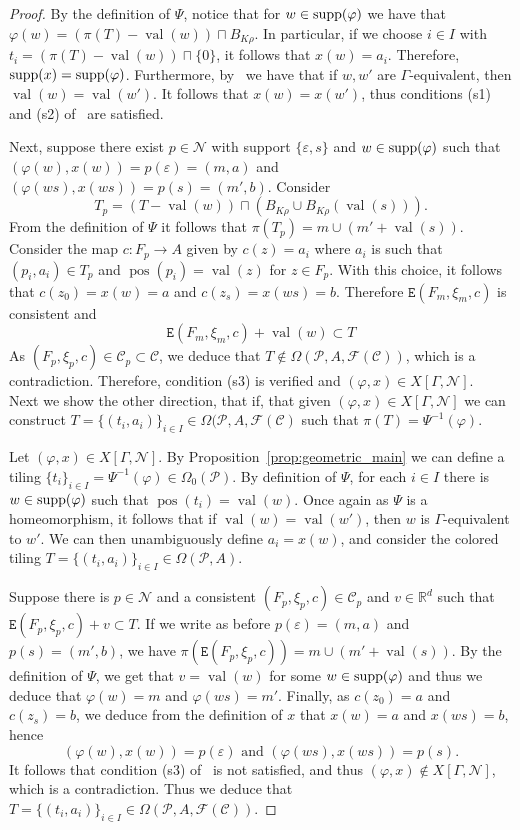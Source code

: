 \documentclass{article}
\theoremstyle{definition}
\theoremstyle{definition}
\newcommand{\RR}{\mathbb{R}}
\newcommand{\PP}{\mathcal{P}}
\newcommand{\FF}{\mathcal{F}}
\newcommand{\val}{\operatorname{val}}
\newcommand{\pos}{\operatorname{pos}}
\newcommand{\supp}{\textnormal{supp}}
\begin{document}
\begin{proof}
By the definition of $\Psi$, notice that for $w \in \supp(\varphi)$ we have that $\varphi(w)= (\pi(T)-\val(w))\sqcap B_{K\rho}$. In particular, if we choose $i \in I$ with $t_i = (\pi(T)-\val(w))\sqcap \{0\}$, it follows that $x(w)=a_i$. Therefore, $\supp(x)=\supp(\varphi)$. Furthermore, by~ we have that if $w,w'$ are $\Gamma$-equivalent, then $\val(w)=\val(w')$. It follows that $x(w)=x(w')$, thus conditions (s1) and (s2) of~ are satisfied.

Next, suppose there exist $p \in \mathcal{N}$ with support $\{\varepsilon,s\}$ and $w \in \supp(\varphi)$ such that $(\varphi(w),x(w))=p(\varepsilon)=(m,a)$ and $(\varphi(ws),x(ws))=p(s)= (m',b)$. Consider \[T_p = (T - \val(w)) \sqcap (B_{K\rho}\cup B_{K\rho}(\val(s))).\]
From the definition of $\Psi$ it follows that $\pi(T_p) = m \cup (m'+\val(s))$. Consider the map $c \colon F_p \to A$ given by $c(z)= a_i$ where $a_i$ is such that $(p_i,a_i) \in T_p$ and $\pos(p_i)=\val(z)$ for $z\in F_p$. With this choice, it follows that $c(z_0)=x(w)=a$ and $c(z_s)=x(ws)=b$. Therefore $\mathtt{E}(F_m,\xi_m,c)$ is consistent and \[ \mathtt{E}(F_m,\xi_m,c) + \val(w) \subset T \]
 As $(F_p,\xi_p,c) \in \mathcal{C}_p \subset \mathcal{C}$, we deduce that $T \notin \Omega(\PP,A,\mathcal{F}(\mathcal{C}))$, which is a contradiction. Therefore, condition (s3) is verified and $(\varphi, x)\in X[\Gamma, \mathcal{N}]$.\\

Next we show the other direction, that if, that given $(\varphi, x)\in X[\Gamma,\mathcal{N}]$ we can construct $T=\{(t_i,a_i)\}_{i \in I}\in \Omega(\PP,A,\FF(\mathcal{C})$ such that $\pi(T)=\Psi^{-1}(\varphi)$.

Let $(\varphi, x)\in X[\Gamma,\mathcal{N}]$. By Proposition~\ref{prop:geometric_main} we can define a tiling $\{t_i\}_{i \in I} = \Psi^{-1}(\varphi)\in\Omega_0(\PP)$. By definition of $\Psi$, for each $i \in I$ there is $w \in \supp(\varphi)$ such that $\pos(t_i)=\val(w)$. Once again as $\Psi$ is a homeomorphism, it follows that if $\val(w)=\val(w')$, then $w$ is $\Gamma$-equivalent to $w'$. We can then unambiguously define $a_i = x(w)$, and consider the colored tiling $T=\{(t_i,a_i)\}_{i \in I}\in \Omega(\PP,A)$.

Suppose there is $p \in \mathcal{N}$ and a consistent $(F_p,\xi_p,c)\in \mathcal{C}_p$ and $v \in \RR^d$ such that $\mathtt{E}(F_p,\xi_p,c)+v \subset T$. If we write as before $p(\varepsilon)=(m,a)$ and $p(s)= (m',b)$, we have $\pi(\mathtt{E}(F_p,\xi_p,c)) = m\cup (m'+\val(s))$. By the definition of $\Psi$, we get that $v=\val(w)$ for some $w \in \supp(\varphi)$ and thus we deduce that $\varphi(w)=m$ and $\varphi(ws)=m'$. Finally, as $c(z_0)=a$ and $c(z_s)=b$, we deduce from the definition of $x$ that $x(w)=a$ and $x(ws)=b$, hence \[(\varphi(w),x(w))=p(\varepsilon) \mbox{ and }(\varphi(ws),x(ws))=p(s).\]
It follows that condition (s3) of~ is not satisfied, and thus $(\varphi,x)\notin X[\Gamma,\mathcal{N}]$, which is a contradiction. Thus we deduce that  $T=\{(t_i,a_i)\}_{i \in I}\in \Omega(\PP,A,\FF(\mathcal{C}))$.


\end{proof}
\end{document}
